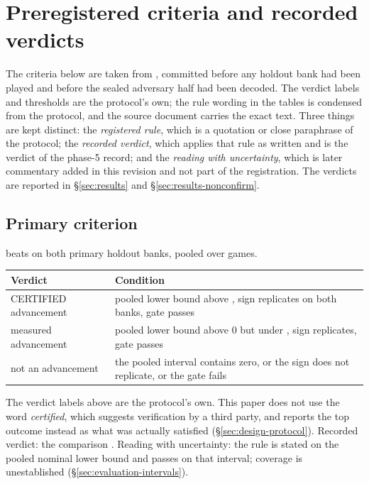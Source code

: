 \section{Preregistered criteria and recorded verdicts}
\label{app:thresholds}

The criteria below are taken from , committed before any
holdout bank had been played and before the sealed adversary half had been decoded. The verdict
labels and thresholds are the protocol's own; the rule wording in the tables is condensed from the
protocol, and the source document carries the exact text. Three things are kept distinct: the
\emph{registered rule}, which is a quotation or close paraphrase of the protocol; the
\emph{recorded verdict}, which applies that rule as written and is the verdict of the phase-5
record; and the \emph{reading with uncertainty}, which is later commentary added in this revision
and not part of the registration. The verdicts are reported in \S\ref{sec:results} and
\S\ref{sec:results-nonconfirm}.

\subsection*{Primary criterion}

\sestina{} beats \fcheap{} on both primary holdout banks, pooled over \vsevenBtwoFcheapN{} games.

\begin{center}\tabfont
\begin{tabularx}{\linewidth}{@{}l L@{}}
\toprule
Verdict & Condition \\
\midrule
CERTIFIED advancement & pooled lower bound above \vsevenPrimaryFloor{}, sign replicates on both banks, gate passes \\
measured advancement & pooled lower bound above 0 but under \vsevenPrimaryFloor{}, sign replicates, gate passes \\
not an advancement & the pooled interval contains zero, or the sign does not replicate, or the gate fails \\
\bottomrule
\end{tabularx}
\end{center}

\noindent
The verdict labels above are the protocol's own. This paper does not use the word \emph{certified},
which suggests verification by a third party, and reports the top outcome instead as what was
actually satisfied (\S\ref{sec:design-protocol}). Recorded verdict: the comparison
\vsevenPrimaryVerdict{}. Reading with uncertainty: the rule is stated on the pooled nominal lower
bound and passes on that interval; coverage is unestablished (\S\ref{sec:evaluation-intervals}).

